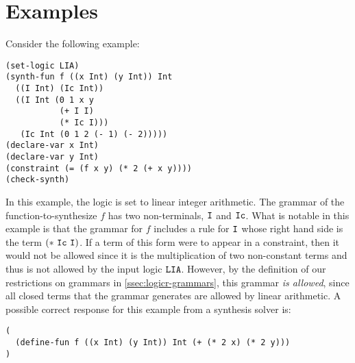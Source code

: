 \documentclass[english,a4paper,10pt]{article}
\begin{document}
\section{Examples}%
\label{sec:examples}


\begin{example}
Consider the following example:
\begin{lstlisting}[language=SyGuS]
(set-logic LIA)
(synth-fun f ((x Int) (y Int)) Int
  ((I Int) (Ic Int))
  ((I Int (0 1 x y
           (+ I I)
           (* Ic I)))
   (Ic Int (0 1 2 (- 1) (- 2)))))
(declare-var x Int)
(declare-var y Int)
(constraint (= (f x y) (* 2 (+ x y))))
(check-synth)
\end{lstlisting}
In this example, the logic is set 
to linear integer arithmetic.
The grammar of the function-to-synthesize $f$
has two non-terminals, ${\tt I}$ and ${\tt Ic}$.
What is notable in this example is that
the grammar for $f$ includes a rule for ${\tt I}$ whose right hand side 
is the term ${\tt(*\ Ic\ I)}$. 
If a term of this form were to appear
in a constraint, 
then it would not be allowed since it is the
multiplication of two non-constant terms and thus is not allowed by the input logic ${\tt LIA}$.
However, 
by the definition of our restrictions on grammars in \cref{ssec:logicr-grammars},
this grammar \emph{is allowed},
since all closed terms that the grammar generates are allowed by linear arithmetic.
A possible correct response for this example from a synthesis solver is:
\begin{lstlisting}[language=SyGuS]
(
  (define-fun f ((x Int) (y Int)) Int (+ (* 2 x) (* 2 y)))
)
\end{lstlisting}
\end{example}
\end{document}
